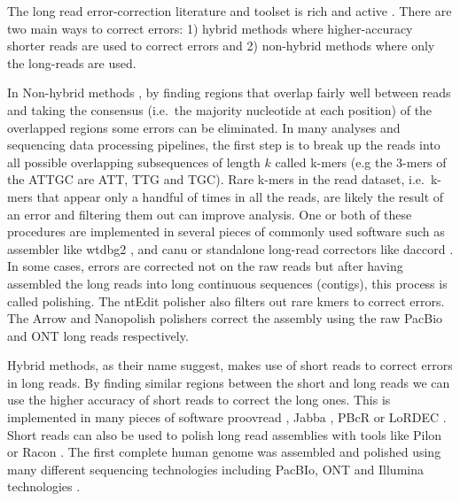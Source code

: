\documentclass[
  11pt,
  twoside]{scrbook}
\begin{document}
The long read error-correction literature and toolset is rich and active \autocite{limaComparativeAssessmentLongread2020,fuComparativeEvaluationHybrid2019,zhangComprehensiveEvaluationLong2020}. There are two main ways to correct errors: 1) hybrid methods where higher-accuracy shorter reads are used to correct errors and 2) non-hybrid methods where only the long-reads are used.

In Non-hybrid methods \autocite{limaComparativeAssessmentLongread2020,amarasingheOpportunitiesChallengesLongread2020}, by finding regions that overlap fairly well between reads and taking the consensus (i.e.~the majority nucleotide at each position) of the overlapped regions some errors can be eliminated. In many analyses and sequencing data processing pipelines, the first step is to break up the reads into all possible overlapping subsequences of length \(k\) called k-mers (e.g the 3-mers of the ATTGC are ATT, TTG and TGC). Rare k-mers in the read dataset, i.e.~k-mers that appear only a handful of times in all the reads, are likely the result of an error and filtering them out can improve analysis. One or both of these procedures are implemented in several pieces of commonly used software such as assembler like wtdbg2 \autocite{ruanFastAccurateLongread2020}, and canu \autocite{korenCanuScalableAccurate2017} or standalone long-read correctors like daccord \autocite{tischlerNonHybridLong2017}. In some cases, errors are corrected not on the raw reads but after having assembled the long reads into long continuous sequences (contigs), this process is called polishing. The ntEdit polisher \autocite{warrenNtEditScalableGenome2019} also filters out rare kmers to correct errors. The Arrow \autocite{heplerImprovedCircularConsensus2016} and Nanopolish \autocite{simpsonDetectingDNACytosine2017} polishers correct the assembly using the raw PacBio and ONT long reads respectively.

Hybrid methods, as their name suggest, makes use of short reads to correct errors in long reads. By finding similar regions between the short and long reads we can use the higher accuracy of short reads to correct the long ones. This is implemented in many pieces of software proovread \autocite{hacklProovreadLargescaleHighaccuracy2014}, Jabba \autocite{miclotteJabbaHybridError2016}, PBcR \autocite{korenHybridErrorCorrection2012} or LoRDEC \autocite{salmelaLoRDECAccurateEfficient2014}. Short reads can also be used to polish long read assemblies with tools like Pilon \autocite{walkerPilonIntegratedTool2014} or Racon \autocite{vaserFastAccurateNovo2017}. The first complete human genome was assembled and polished using many different sequencing technologies including PacBIo, ONT and Illumina technologies \autocite{nurk2022}.
\end{document}
